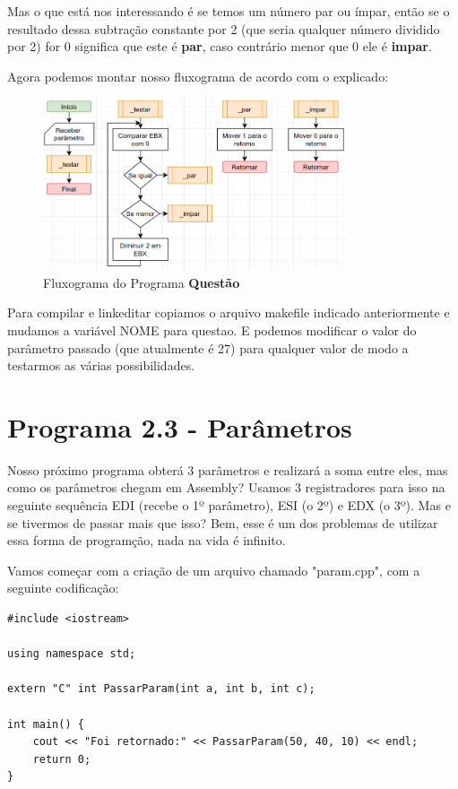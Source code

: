 Mas o que está nos interessando é se temos um número par ou ímpar, então se o resultado dessa subtração constante por 2 (que seria qualquer número dividido por 2) for 0 significa que este é \textbf{par}, caso contrário menor que 0 ele é \textbf{impar}.

Agora podemos montar nosso fluxograma de acordo com o explicado:
\begin{figure}[H]
	\centering
	\includegraphics[width=0.8\textwidth]{Pictures/cap02/programa6}
	\caption{Fluxograma do Programa \textbf{Questão}}
\end{figure}

Para compilar e linkeditar copiamos o arquivo makefile indicado anteriormente e mudamos a variável NOME para questao. E podemos modificar o valor do parâmetro passado (que atualmente é 27) para qualquer valor de modo a testarmos as várias possibilidades.

\section{Programa 2.3 - Parâmetros}
Nosso próximo programa obterá 3 parâmetros e realizará a soma entre eles, mas como os parâmetros chegam em Assembly? Usamos 3 registradores para isso na seguinte sequência EDI (recebe o 1º parâmetro), ESI (o 2º) e EDX (o 3º). Mas e se tivermos de passar mais que isso? Bem, esse é um dos problemas de utilizar essa forma de programção, nada na vida é infinito.

Vamos começar com a criação de um arquivo chamado "param.cpp", com a seguinte codificação:
\begin{lstlisting}[]
#include <iostream>

using namespace std;

extern "C" int PassarParam(int a, int b, int c);

int main() {
	cout << "Foi retornado:" << PassarParam(50, 40, 10) << endl;
	return 0;
}
\end{lstlisting}


